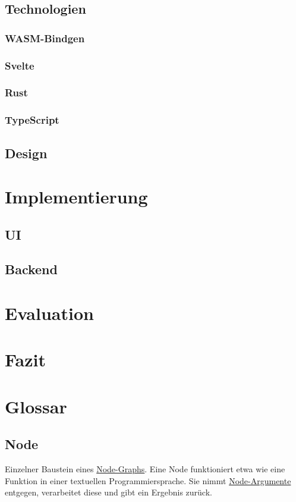 \documentclass[ngerman]{article}
\begin{document}
\subsection{Technologien}
\subsubsection{WASM-Bindgen}
\label{sec:WASM-Bindgen}
\subsubsection{Svelte}
\label{sec:Svelte}
\subsubsection{Rust}
\label{sec:Rust}
\subsubsection{TypeScript}
\label{sec:TypeScript}
\subsection{Design}

\section{Implementierung}
\subsection{UI}
\subsection{Backend}

\section{Evaluation}
\section{Fazit}

\pagebreak
\section{Glossar}

\subsection{Node}
\label{sec:Node}
Einzelner Baustein eines \hyperref[sec:Node-Graph]{Node-Graphs}. Eine Node funktioniert etwa wie eine Funktion in einer textuellen Programmiersprache. Sie nimmt \hyperref[sec:Node-Argumente]{Node-Argumente} entgegen, verarbeitet diese und gibt ein Ergebnis zurück. 
\end{document}
